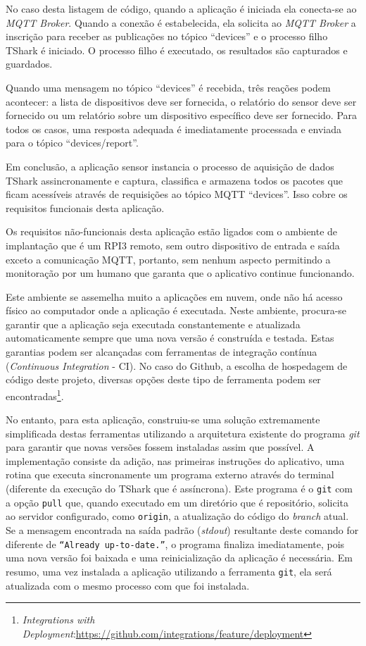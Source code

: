 No caso desta listagem de código, quando a aplicação é iniciada ela conecta-se ao \emph{MQTT Broker}.
Quando a conexão é estabelecida, ela solicita ao \emph{MQTT Broker} a inscrição
para receber as publicações no tópico ``devices'' e o processo filho TShark
é iniciado. O processo filho é executado, os resultados são capturados e
guardados.

Quando uma mensagem no tópico ``devices'' é recebida, três reações podem acontecer:
a lista de dispositivos deve ser fornecida, o relatório do sensor deve ser
fornecido ou um relatório sobre um dispositivo específico deve ser fornecido.
Para todos os casos, uma resposta adequada é imediatamente processada e enviada
para o tópico ``devices/report''.

Em conclusão, a aplicação sensor instancia o processo de aquisição de dados
TShark assincronamente e captura, classifica e armazena todos os pacotes
que ficam acessíveis através de requisições ao tópico MQTT ``devices''.
Isso cobre os requisitos funcionais desta aplicação.

Os requisitos não-funcionais desta aplicação estão ligados com o ambiente de
implantação que é um RPI3 remoto, sem outro dispositivo de entrada e saída
exceto a comunicação MQTT, portanto, sem nenhum aspecto permitindo a
monitoração por um humano que garanta que o aplicativo continue funcionando.

Este ambiente se assemelha muito a aplicações em nuvem, onde não há acesso
físico ao computador onde a aplicação é executada. Neste ambiente, procura-se
garantir que a aplicação seja executada constantemente e atualizada
automaticamente sempre que uma nova versão é construída e testada. Estas
garantias podem ser alcançadas com ferramentas de integração contínua
(\emph{Continuous Integration} - CI). No caso do Github, a escolha de hospedagem
de código deste projeto, diversas opções deste tipo de ferramenta podem ser
encontradas\footnote{\emph{Integrations with Deployment}:\url{https://github.com/integrations/feature/deployment}}.

No entanto, para esta aplicação, construiu-se uma solução extremamente
simplificada destas ferramentas utilizando a arquitetura existente do programa
\emph{git} para garantir que novas versões fossem instaladas assim que possível.
A implementação consiste da adição, nas primeiras instruções do aplicativo,
uma rotina que executa sincronamente um programa externo através do terminal
(diferente da execução do TShark que é assíncrona). Este programa é
o \texttt{git} com a opção \texttt{pull} que, quando executado em um diretório que
é repositório, solicita ao servidor configurado, como \texttt{origin}, a atualização
do código do \emph{branch} atual. Se a mensagem encontrada na saída padrão
(\emph{stdout}) resultante deste comando for diferente de
\texttt{``Already up-to-date.''}, o programa finaliza imediatamente, pois uma nova
versão foi baixada e uma reinicialização da aplicação é necessária.
Em resumo, uma vez instalada a aplicação utilizando a ferramenta \texttt{git}, ela
será atualizada com o mesmo processo com que foi instalada.

